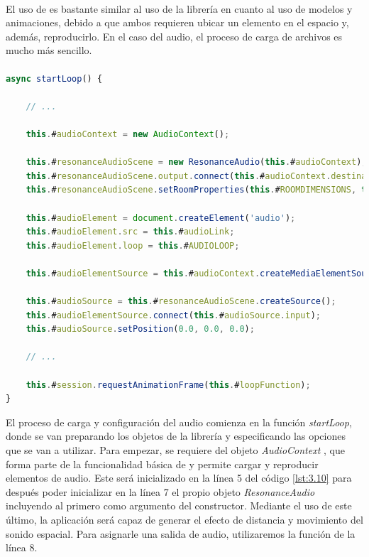 \documentclass{subfiles}
\begin{document}
        \paragraph{}
        El uso de \resonanceaudio es bastante similar al uso de la librería \threejs en cuanto al uso de modelos y animaciones, debido a que ambos requieren ubicar un elemento en el espacio y, además, reproducirlo. En el caso del audio, el proceso de carga de archivos es mucho más sencillo.

\paragraph{}
\begin{lstlisting}[language=JavaScript, caption={Preparación del sonido espacial.}, label={lst:3.10}]
async startLoop() {

    // ...

    this.#audioContext = new AudioContext();

    this.#resonanceAudioScene = new ResonanceAudio(this.#audioContext);
    this.#resonanceAudioScene.output.connect(this.#audioContext.destination);
    this.#resonanceAudioScene.setRoomProperties(this.#ROOMDIMENSIONS, this.#ROOMMATERIALS);

    this.#audioElement = document.createElement('audio');
    this.#audioElement.src = this.#audioLink;
    this.#audioElement.loop = this.#AUDIOLOOP;

    this.#audioElementSource = this.#audioContext.createMediaElementSource(this.#audioElement);

    this.#audioSource = this.#resonanceAudioScene.createSource();
    this.#audioElementSource.connect(this.#audioSource.input);
    this.#audioSource.setPosition(0.0, 0.0, 0.0);

    // ...

    this.#session.requestAnimationFrame(this.#loopFunction);
}
\end{lstlisting}

        El proceso de carga y configuración del audio comienza en la función \textit{startLoop}, donde se van preparando los objetos de la librería y especificando las opciones que se van a utilizar. Para empezar, se requiere del objeto \textit{AudioContext} \cite{web:mozilla_audiocontext}, que forma parte de la funcionalidad básica de \js y permite cargar y reproducir elementos de audio. Este será inicializado en la línea 5 del código \ref{lst:3.10} para después poder inicializar en la línea 7 el propio objeto \textit{ResonanceAudio} \cite{web:resonance_audio_resonanceaudio} incluyendo al primero como argumento del constructor. Mediante el uso de este último, la aplicación será capaz de generar el efecto de distancia y movimiento del sonido espacial. Para asignarle una salida de audio, utilizaremos la función de la línea 8.
\end{document}

